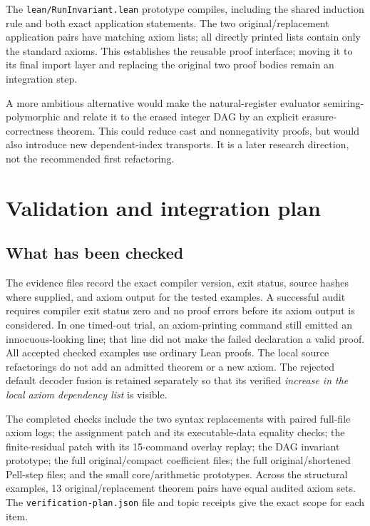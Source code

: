 \documentclass[11pt,letterpaper]{article}
\newcommand{\artifact}[1]{\nolinkurl{#1}}
\begin{document}
The \artifact{lean/RunInvariant.lean} prototype compiles, including the shared induction rule and both exact application statements. The two original/replacement application pairs have matching axiom lists; all directly printed lists contain only the standard axioms. This establishes the reusable proof interface; moving it to its final import layer and replacing the original two proof bodies remain an integration step.

A more ambitious alternative would make the natural-register evaluator
semiring-polymorphic and relate it to the erased integer DAG by an explicit
erasure-correctness theorem. This could reduce cast and nonnegativity
proofs, but would also introduce new dependent-index transports. It is a
later research direction, not the recommended first refactoring.

\section{Validation and integration plan}

\subsection{What has been checked}

The evidence files record the exact compiler version, exit status, source
hashes where supplied, and axiom output for the tested examples. A successful audit requires compiler exit status zero and no proof errors before its axiom output is considered. In one timed-out trial, an axiom-printing command still emitted an innocuous-looking line; that line did not make the failed declaration a valid proof. All
accepted checked examples use ordinary Lean proofs. The local source
refactorings do not add an admitted theorem or a new axiom. The rejected
default decoder fusion is retained separately so that its verified
\emph{increase in the local axiom dependency list} is visible.

The completed checks include the two syntax replacements with paired full-file axiom logs; the assignment patch and its executable-data equality checks; the finite-residual patch with its 15-command overlay replay; the DAG invariant prototype; the full original/compact coefficient files; the full original/shortened Pell-step files; and the small core/arithmetic prototypes. Across the structural examples, 13 original/replacement theorem pairs have equal audited axiom sets. The \texttt{verification-plan.json} file and topic receipts give the exact scope for each item.
\end{document}
